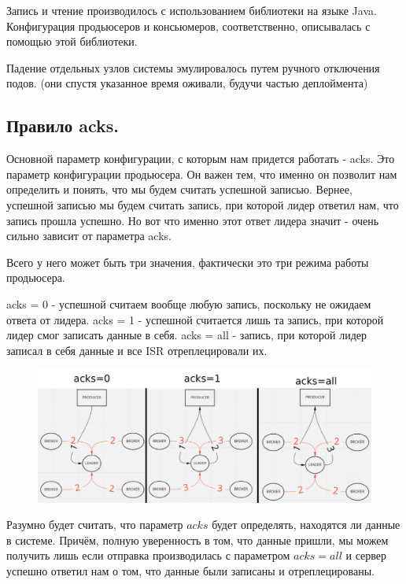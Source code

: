 \documentclass[11pt]{article}
\begin{document}
    Запись и чтение производилось с использованием библиотеки на языке Java. Конфигурация продьюсеров и консьюмеров,
    соответственно, описывалась с помощью этой библиотеки.

    Падение отдельных узлов системы эмулировалось путем ручного отключения подов. (они спустя указанное время оживали,
    будучи частью деплоймента)

    \subsection{Правило acks.}
    Основной параметр конфигурации, с которым нам придется работать - acks. Это параметр конфигурации продьюсера. Он
    важен тем, что именно он позволит нам определить и понять, что мы будем считать успешной записью. Вернее,
    успешной записью мы будем считать запись, при которой лидер ответил нам, что запись прошла успешно. Но вот что
    именно этот ответ лидера значит - очень сильно зависит от параметра acks.

    Всего у него может быть три значения, фактически это три режима работы продьюсера.

    acks = 0 - успешной считаем вообще любую запись, поскольку не ожидаем ответа от лидера.
    acks = 1 - успешной считается лишь та запись, при которой лидер смог записать данные в себя.
    acks = all - запись, при которой лидер записал в себя данные и все ISR отреплецировали их.
    \begin{figure}
        \centering
        \includegraphics[width=17cm]{acks}
        \caption{}
        \label{fig:}
    \end{figure}

    Разумно будет считать, что параметр $acks$ будет определять, находятся ли данные в системе. Причём, полную уверенность в том, что данные пришли, мы можем получить лишь если отправка производилась с параметром $acks=all$ и сервер успешно ответил нам о том, что данные были записаны и отреплецированы.
\end{document}
